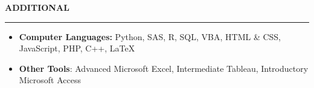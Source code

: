 \documentclass[11pt,letterpaper]{article}
\newcommand{\sectline}{\vspace{4pt}\hrule height 1.5pt\vspace{4pt}}
\begin{document}
\textbf{ADDITIONAL}\sectline
\begin{itemize}
	\item \textbf{Computer Languages:} Python, SAS, R, SQL, VBA, HTML \& CSS, JavaScript, PHP, C++, \LaTeX
	\item \textbf{Other Tools}: Advanced Microsoft Excel, Intermediate Tableau, Introductory Microsoft Access
\end{itemize}
\end{document}
